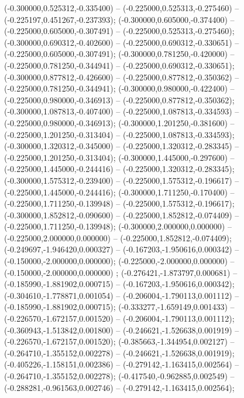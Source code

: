  (-0.300000,0.525312,-0.335400) -- (-0.225000,0.525313,-0.275460) -- (-0.225197,0.451267,-0.237393);
 (-0.300000,0.605000,-0.374400) -- (-0.225000,0.605000,-0.307491) -- (-0.225000,0.525313,-0.275460);
 (-0.300000,0.690312,-0.402600) -- (-0.225000,0.690312,-0.330651) -- (-0.225000,0.605000,-0.307491);
 (-0.300000,0.781250,-0.420000) -- (-0.225000,0.781250,-0.344941) -- (-0.225000,0.690312,-0.330651);
 (-0.300000,0.877812,-0.426600) -- (-0.225000,0.877812,-0.350362) -- (-0.225000,0.781250,-0.344941);
 (-0.300000,0.980000,-0.422400) -- (-0.225000,0.980000,-0.346913) -- (-0.225000,0.877812,-0.350362);
 (-0.300000,1.087813,-0.407400) -- (-0.225000,1.087813,-0.334593) -- (-0.225000,0.980000,-0.346913);
 (-0.300000,1.201250,-0.381600) -- (-0.225000,1.201250,-0.313404) -- (-0.225000,1.087813,-0.334593);
 (-0.300000,1.320312,-0.345000) -- (-0.225000,1.320312,-0.283345) -- (-0.225000,1.201250,-0.313404);
 (-0.300000,1.445000,-0.297600) -- (-0.225000,1.445000,-0.244416) -- (-0.225000,1.320312,-0.283345);
 (-0.300000,1.575312,-0.239400) -- (-0.225000,1.575312,-0.196617) -- (-0.225000,1.445000,-0.244416);
 (-0.300000,1.711250,-0.170400) -- (-0.225000,1.711250,-0.139948) -- (-0.225000,1.575312,-0.196617);
 (-0.300000,1.852812,-0.090600) -- (-0.225000,1.852812,-0.074409) -- (-0.225000,1.711250,-0.139948);
 (-0.300000,2.000000,0.000000) -- (-0.225000,2.000000,0.000000) -- (-0.225000,1.852812,-0.074409);
 (-0.249697,-1.946420,0.000327) -- (-0.167203,-1.950616,0.000342) -- (-0.150000,-2.000000,0.000000);
 (-0.225000,-2.000000,0.000000) -- (-0.150000,-2.000000,0.000000) ;
 (-0.276421,-1.873797,0.000681) -- (-0.185990,-1.881902,0.000715) -- (-0.167203,-1.950616,0.000342);
 (-0.304610,-1.778871,0.001054) -- (-0.206004,-1.790113,0.001112) -- (-0.185990,-1.881902,0.000715);
 (-0.333277,-1.659149,0.001433) -- (-0.226570,-1.672157,0.001520) -- (-0.206004,-1.790113,0.001112);
 (-0.360943,-1.513842,0.001800) -- (-0.246621,-1.526638,0.001919) -- (-0.226570,-1.672157,0.001520);
 (-0.385663,-1.344954,0.002127) -- (-0.264710,-1.355152,0.002278) -- (-0.246621,-1.526638,0.001919);
 (-0.405226,-1.158151,0.002386) -- (-0.279142,-1.163415,0.002564) -- (-0.264710,-1.355152,0.002278);
 (-0.417540,-0.962885,0.002549) -- (-0.288281,-0.961563,0.002746) -- (-0.279142,-1.163415,0.002564);
